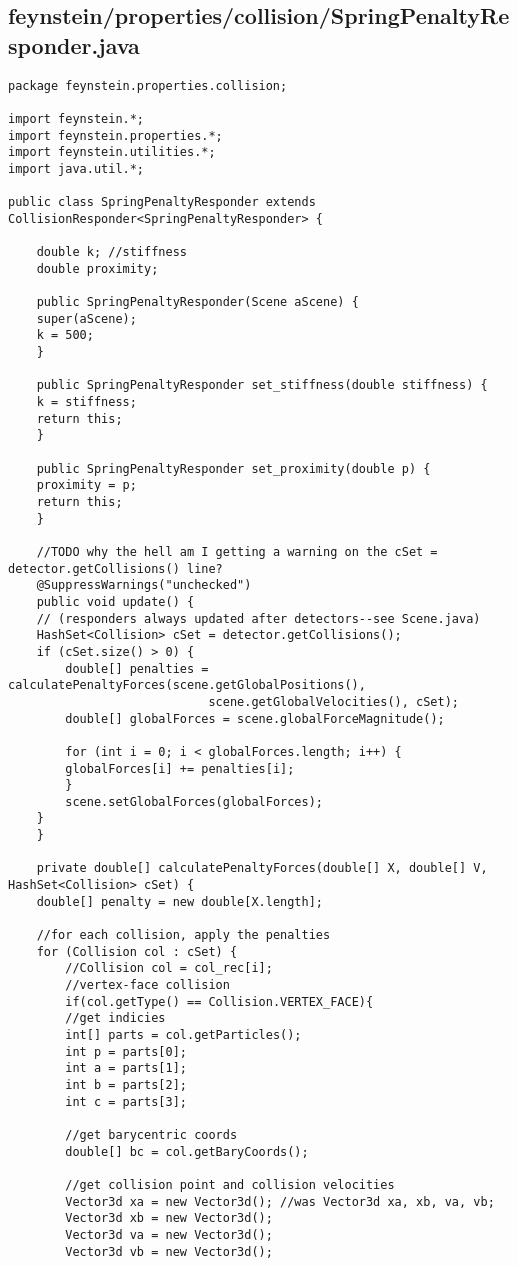 \subsection*{feynstein/properties/collision/SpringPenaltyResponder.java}
\begin{lstlisting}
package feynstein.properties.collision;

import feynstein.*;
import feynstein.properties.*;
import feynstein.utilities.*;
import java.util.*;

public class SpringPenaltyResponder extends CollisionResponder<SpringPenaltyResponder> {
    
    double k; //stiffness
    double proximity;

    public SpringPenaltyResponder(Scene aScene) {
	super(aScene);
	k = 500;
    }

    public SpringPenaltyResponder set_stiffness(double stiffness) {
	k = stiffness;
	return this;
    }

    public SpringPenaltyResponder set_proximity(double p) {
	proximity = p;
	return this;
    }

    //TODO why the hell am I getting a warning on the cSet = detector.getCollisions() line?
    @SuppressWarnings("unchecked")
    public void update() {
	// (responders always updated after detectors--see Scene.java)
	HashSet<Collision> cSet = detector.getCollisions();
	if (cSet.size() > 0) {
	    double[] penalties = calculatePenaltyForces(scene.getGlobalPositions(), 
							scene.getGlobalVelocities(), cSet);
	    double[] globalForces = scene.globalForceMagnitude();

	    for (int i = 0; i < globalForces.length; i++) {
		globalForces[i] += penalties[i];
	    }
	    scene.setGlobalForces(globalForces);
	}
    }

    private double[] calculatePenaltyForces(double[] X, double[] V, HashSet<Collision> cSet) {
	double[] penalty = new double[X.length];

	//for each collision, apply the penalties
	for (Collision col : cSet) {
	    //Collision col = col_rec[i];
	    //vertex-face collision
	    if(col.getType() == Collision.VERTEX_FACE){
		//get indicies
		int[] parts = col.getParticles();
		int p = parts[0];
		int a = parts[1]; 
		int b = parts[2]; 
		int c = parts[3];

		//get barycentric coords
		double[] bc = col.getBaryCoords();

		//get collision point and collision velocities
		Vector3d xa = new Vector3d(); //was Vector3d xa, xb, va, vb;
		Vector3d xb = new Vector3d();
		Vector3d va = new Vector3d();
		Vector3d vb = new Vector3d();


\end{lstlisting}
